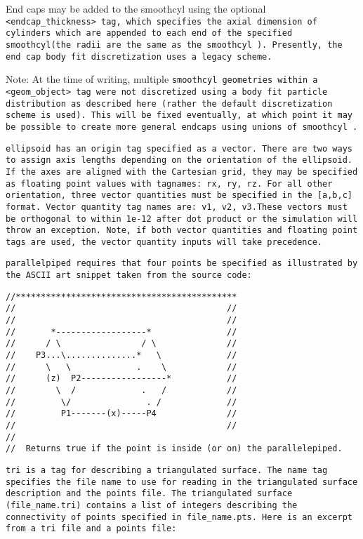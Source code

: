 End caps may be added to the smoothcyl using the optional \tt
<endcap\_thickness> \normalfont tag, which specifies the axial
dimension of cylinders which are appended to each end of the specified
\tt smoothcyl\normalfont (the radii are the same as the \tt smoothcyl
\normalfont).  Presently, the end cap body fit discretization uses a
legacy scheme.

Note: At the time of writing, multiple \tt smoothcyl \normalfont
geometries within a \tt <geom\_object> \normalfont tag were not
discretized using a body fit particle distribution as described here
(rather the default discretization scheme is used).  This will be
fixed eventually, at which point it may be possible to create more
general endcaps using unions of \tt smoothcyl \normalfont.

\tt ellipsoid \normalfont has an origin tag specified as a vector.  There are
two ways to assign axis lengths depending on the orientation of the ellipsoid.
If the axes are aligned with the Cartesian grid, they may be specified as
floating point values with tagnames: rx, ry, rz.  For all other orientation,
three vector quantities must be specified in the \tt [a,b,c] \normalfont format.
Vector quantity tag names are: v1, v2, v3.These vectors must be orthogonal
to within 1e-12 after dot product or the simulation will throw an exception.
Note, if both vector quantities and floating point tags are used,
the vector quantity inputs will take precedence.

\tt parallelpiped \normalfont requires that four points be specified as
illustrated by the ASCII art snippet taken from the source code:

\begin{Verbatim}[fontsize=\footnotesize]
//********************************************
//                                          //
//                                          //
//       *------------------*               //
//      / \                / \              //
//    P3...\..............*   \             //
//      \   \             .    \            //
//      (z)  P2-----------------*           //
//        \  /             .   /            //
//         \/               . /             //
//         P1-------(x)-----P4              //
//                                          //
//
//  Returns true if the point is inside (or on) the parallelepiped.

\end{Verbatim}

\tt tri \normalfont is a tag for describing a triangulated surface.
The name tag specifies the file name to use for reading in the
triangulated surface description and the points file.  The
triangulated surface (file\_name.tri) contains a list of integers
describing the connectivity of points specified in file\_name.pts.
Here is an excerpt from a tri file and a points file:

